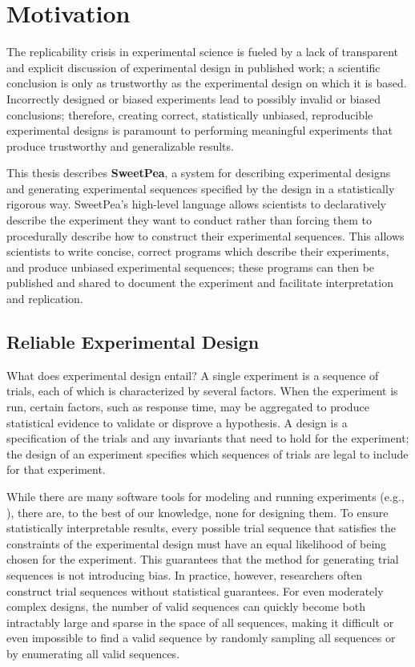 
\chapter{Motivation}


The replicability crisis in experimental science is fueled by a lack of transparent and explicit discussion of experimental design in published work; a scientific conclusion is only as trustworthy as the experimental design on which it is based. Incorrectly designed or biased experiments lead to possibly invalid or biased conclusions; therefore, creating correct, statistically unbiased, reproducible experimental designs is paramount to performing meaningful experiments that produce trustworthy and generalizable results.

This thesis describes \textbf{SweetPea}, a system for describing experimental designs and generating experimental sequences specified by the design in a statistically rigorous way. SweetPea's high-level language allows scientists to declaratively describe the experiment they want to conduct rather than forcing them to procedurally describe how to construct their experimental sequences. This allows scientists to write concise, correct programs which describe their experiments, and produce unbiased experimental sequences; these programs can then be published and shared to document the experiment and facilitate interpretation and replication.

\section{Reliable Experimental Design}

What does experimental design entail? A single experiment is a sequence of trials, each of which is characterized by several factors. When the experiment is run, certain factors, such as response time, may be aggregated to produce statistical evidence to validate or disprove a hypothesis. A design is a specification of the trials and any invariants that need to hold for the experiment; the design of an experiment specifies which sequences of trials are legal to include for that experiment.

While there are many software tools for modeling and running experiments (e.g., \cite{cohen1993psyscope} \cite{mathot2012opensesame} \cite{peirce2009generating}), there are, to the best of our knowledge, none for designing them. To ensure statistically interpretable results, every possible trial sequence that satisfies the constraints of the experimental design must have an equal likelihood of being chosen for the experiment. This guarantees that the method for generating trial sequences is not introducing bias. In practice, however, researchers often construct trial sequences without statistical guarantees. For even moderately complex designs, the number of valid sequences can quickly become both intractably large and sparse in the space of all sequences, making it difficult or even impossible to find a valid sequence by randomly sampling all sequences or by enumerating all valid sequences.

